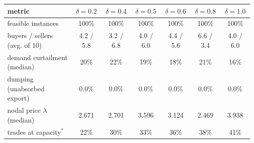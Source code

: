 
\begin{tabular}{lcccccc}
\toprule
metric & $\delta=0.2$ & $\delta=0.4$ & $\delta=0.5$ & $\delta=0.6$ & $\delta=0.8$ & $\delta=1.0$ \\
\midrule
feasible instances & 100\% & 100\% & 100\% & 100\% & 100\% & 100\% \\
buyers / sellers (avg. of 10) & 4.2 / 5.8 & 3.2 / 6.8 & 4.0 / 6.0 & 4.4 / 5.6 & 6.6 / 3.4 & 4.0 / 6.0 \\
demand curtailment (median) & 20\% & 22\% & 19\% & 18\% & 21\% & 16\% \\
dumping (unabsorbed export) & 0.0\% & 0.0\% & 0.0\% & 0.0\% & 0.0\% & 0.0\% \\
nodal price $\lambda$ (median) & 2.671 & 2.701 & 3.596 & 3.124 & 2.469 & 3.938 \\
trades at capacity$^{*}$ & 22\% & 30\% & 33\% & 36\% & 38\% & 41\% \\
\bottomrule
\end{tabular}
